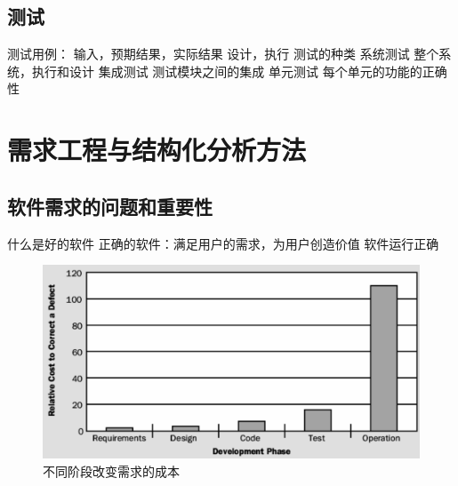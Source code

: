 \documentclass[oneside]{ctexbook}
\begin{document}
\section{测试}
\begin{outline}
    \1 测试用例：
        \2 输入，预期结果，实际结果
        \2 设计，执行
    \1 测试的种类
        \2 系统测试
            \3 整个系统，执行和设计
        \2 集成测试
            \3 测试模块之间的集成
        \2 单元测试
            \3 每个单元的功能的正确性
\end{outline}

\chapter{需求工程与结构化分析方法}
\section{软件需求的问题和重要性}
\begin{outline}
    \1 什么是好的软件
        \2 正确的软件：满足用户的需求，为用户创造价值
        \2 软件运行正确
\end{outline}
\begin{figure}[htp]
  \centering
  \includegraphics[width=.8\linewidth]{image3.png}
  \caption{不同阶段改变需求的成本}
\end{figure}
\end{document}
